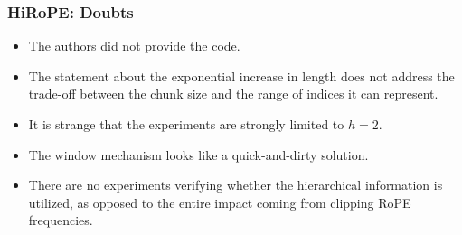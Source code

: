 \documentclass[notheorems,10pt]{beamer}
\begin{document}
\begin{frame}
    \frametitle{HiRoPE: Doubts}

    \begin{itemize}
        \item The authors did not provide the code.
        \vfill
        \item The statement about the exponential increase in length does not address the trade-off between the chunk size and the range of indices it can represent.
        \vfill
        \item It is strange that the experiments are strongly limited to $h = 2$.
        \vfill
        \item The window mechanism looks like a quick-and-dirty solution.
        \vfill
        \item There are no experiments verifying whether the hierarchical information is utilized, as opposed to the entire impact coming from clipping RoPE frequencies.
    \end{itemize}
\end{frame}

\appendix
\end{document}

